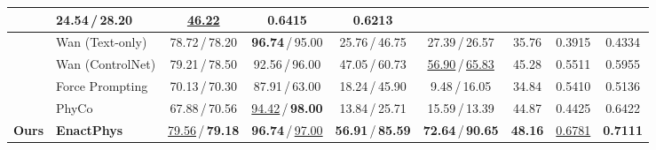 \begin{table}[t]
{\begin{tabular}{@{}llcccc@{\hspace{10pt}}c@{\hspace{10pt}}cc@{}}
& 24.54\,/\,28.20
& \underline{46.22} & 0.6415 & 0.6213 \\
\midrule
{}
& Wan (Text-only)
& 78.72\,/\,78.20 & \textbf{96.74}\,/\,95.00
& 25.76\,/\,46.75 & 27.39\,/\,26.57
& 35.76 & 0.3915 & 0.4334 \\
& Wan (ControlNet)
& 79.21\,/\,78.50 & 92.56\,/\,96.00
& 47.05\,/\,60.73 & \underline{56.90}\,/\,\underline{65.83}
& 45.28 & 0.5511 & 0.5955 \\
& Force Prompting
& 70.13\,/\,70.30 & 87.91\,/\,63.00
& 18.24\,/\,45.90 & 9.48\,/\,16.05
& 34.84 & 0.5410 & 0.5136 \\
& PhyCo
& 67.88\,/\,70.56 & \underline{94.42}\,/\,\textbf{98.00}
& 13.84\,/\,25.71 & 15.59\,/\,13.39
& 44.87 & 0.4425 & 0.6422 \\
\midrule
\textbf{Ours} & \textbf{EnactPhys}
& \underline{79.56}\,/\,\textbf{79.18}
& \textbf{96.74}\,/\,\underline{97.00}
& \textbf{56.91}\,/\,\textbf{85.59}
& \textbf{72.64}\,/\,\textbf{90.65}
& \textbf{48.16} & \underline{0.6781} & \textbf{0.7111} \\
\bottomrule
\end{tabular}%
}
\end{table}